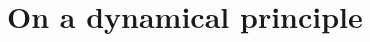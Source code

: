 \documentclass[12pt]{article}
\begin{document}













































\section{On a dynamical principle}
\end{document}
